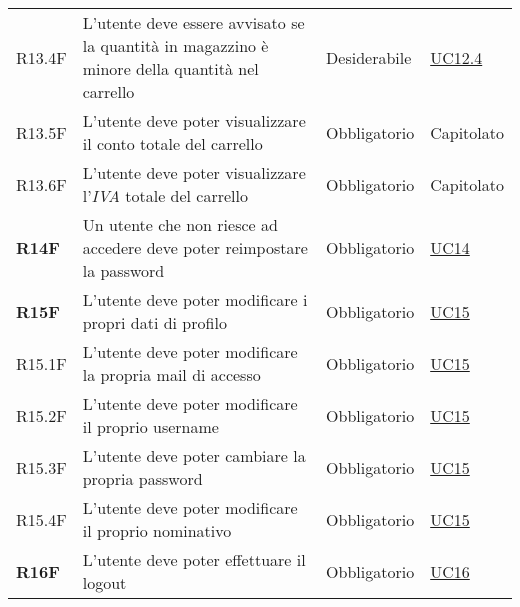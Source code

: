 \begin{center}
\begin{longtable}[!h]{p{50px} p{210px} p{80px} p{50px}}
        R13.4F                                & L'utente deve essere avvisato se la quantità in magazzino è minore della quantità nel carrello      & Desiderabile             & \hyperref[sec:UC12.4]{UC12.4}                \\
        R13.5F                                & L'utente deve poter visualizzare il conto totale del carrello                                       & Obbligatorio             & Capitolato                                   \\
        R13.6F                                & L'utente deve poter visualizzare l'\textit{IVA} totale del carrello                                 & Obbligatorio             & Capitolato                                   \\
        \textbf{R14F}                         & Un utente che non riesce ad accedere deve poter reimpostare la password                             & Obbligatorio             & \hyperref[sec:UC14]{UC14}                    \\
        \textbf{R15F}                         & L'utente deve poter modificare i propri dati di profilo                                             & Obbligatorio             & \hyperref[sec:UC15]{UC15}                    \\
        R15.1F                                & L'utente deve poter modificare la propria mail di accesso                                           & Obbligatorio             & \hyperref[sec:UC15]{UC15}                    \\
        R15.2F                                & L'utente deve poter modificare il proprio username                                                  & Obbligatorio             & \hyperref[sec:UC15]{UC15}                    \\
        R15.3F                                & L'utente deve poter cambiare la propria password                                                    & Obbligatorio             & \hyperref[sec:UC15]{UC15}                    \\
        R15.4F                                & L'utente deve poter modificare il proprio nominativo                                                & Obbligatorio             & \hyperref[sec:UC15]{UC15}                    \\
        \textbf{R16F}                         & L'utente deve poter effettuare il logout                                                            & Obbligatorio             & \hyperref[sec:UC16]{UC16}                    \\

\end{longtable}
\end{center}
